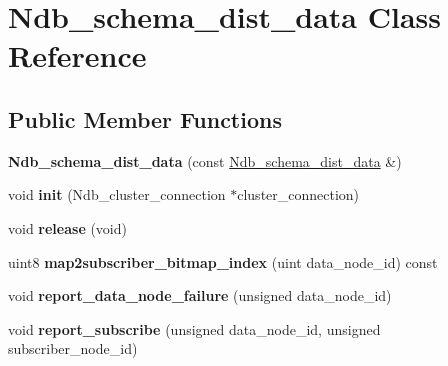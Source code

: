 \hypertarget{classNdb__schema__dist__data}{}\section{Ndb\+\_\+schema\+\_\+dist\+\_\+data Class Reference}
\label{classNdb__schema__dist__data}
\subsection*{Public Member Functions}
\begin{DoxyCompactItemize}
\item 
\mbox{\label{classNdb__schema__dist__data_a5f61e5b794b8a38025a00256a6d2c3c8}} 
{\bfseries Ndb\+\_\+schema\+\_\+dist\+\_\+data} (const \mbox{\hyperlink{classNdb__schema__dist__data}{Ndb\+\_\+schema\+\_\+dist\+\_\+data}} \&)
\item 
\mbox{\label{classNdb__schema__dist__data_ae4e0f7953e455d4282558fb2e6ac1e08}} 
void {\bfseries init} (Ndb\+\_\+cluster\+\_\+connection $\ast$cluster\+\_\+connection)
\item 
\mbox{\label{classNdb__schema__dist__data_a16a2bb2ace6d8f78008e2567da3aa6ca}} 
void {\bfseries release} (void)
\item 
\mbox{\label{classNdb__schema__dist__data_a9619b80eab0d77a181a4397f9071fa2e}} 
uint8 {\bfseries map2subscriber\+\_\+bitmap\+\_\+index} (uint data\+\_\+node\+\_\+id) const
\item 
\mbox{\label{classNdb__schema__dist__data_ac1157d3021485397cde55ded54e3028c}} 
void {\bfseries report\+\_\+data\+\_\+node\+\_\+failure} (unsigned data\+\_\+node\+\_\+id)
\item 
\mbox{\label{classNdb__schema__dist__data_a7eab77f7b838cb715a34f53fde69bb2c}} 
void {\bfseries report\+\_\+subscribe} (unsigned data\+\_\+node\+\_\+id, unsigned subscriber\+\_\+node\+\_\+id)
\item 
\mbox{\label{classNdb__schema__dist__data_a51fe8696c93ff271ec5889ce6b538b7d}} 

\end{DoxyCompactItemize}

